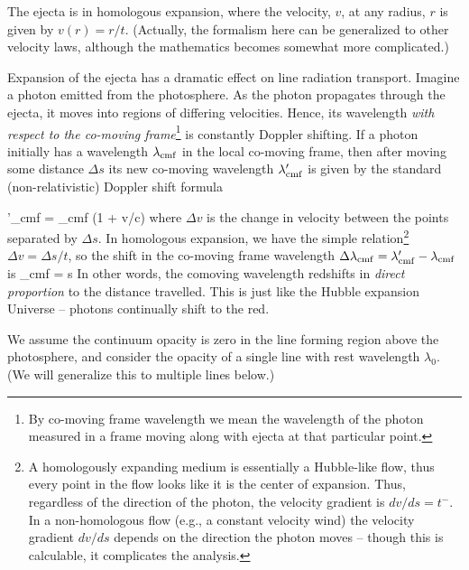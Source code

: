 \documentclass{tufte-handout}
\newcommand{\texp}{\ensuremath{t_{\rm exp}}}
\begin{document}
 The ejecta is in homologous expansion,
where the velocity, $v$, at any radius, $r$ is given by $v(r) = r/t$.
(Actually, the formalism here can be generalized to other velocity laws, although the mathematics becomes somewhat more complicated.)

Expansion of the ejecta has a dramatic effect on line radiation transport. Imagine a photon emitted from the photosphere.
As the photon propagates through the ejecta, it moves into regions of differing velocities. Hence, its wavelength {\it with respect to the co-moving frame}\footnote{By co-moving frame wavelength
we mean the wavelength of the photon
 measured in a frame moving along with ejecta at that particular point.} is constantly Doppler shifting.  If a photon initially has a wavelength $\lambda_{\rm cmf}$ in the local co-moving frame, then after moving some distance $\Delta s$ its new co-moving wavelength $\lambda'_{\rm cmf}$ is given by the standard (non-relativistic) Doppler shift formula

\beq
\lambda'_{\rm cmf} = \lambda_{\rm cmf} (1 + \Delta v/c)
\eeq
where $\Delta v$ is the change in velocity between the points separated by $\Delta s$. In homologous expansion, we have the simple relation\footnote{A homologously  expanding
medium is essentially a Hubble-like flow, thus every point in the flow looks like it is the center of expansion. Thus, regardless of the direction of the photon, the velocity gradient is
$dv/ds = t^{-}$. In a non-homologous flow (e.g., a constant velocity wind) the velocity gradient $dv/ds$  depends on the direction the photon moves -- though this is calculable, it 
complicates the analysis.}
$\Delta v = \Delta s/t$, so
the shift in the co-moving frame wavelength $\Delta \lambda_{\rm cmf} = \lambda'_{\rm cmf}  - \lambda_{\rm cmf}$ is
\beq
\Delta \lambda_{\rm cmf} =  \Delta s 
\label{eq:shift}
\eeq
In other words, the comoving wavelength redshifts  in {\it direct proportion} to the distance travelled. This is just like the Hubble expansion Universe -- photons continually shift to the red.


  We  assume the continuum opacity is zero in the line forming region above the photosphere, and consider the opacity of a single line
with rest wavelength $\lambda_0$. (We will generalize this to multiple lines below.) 
\end{document}
